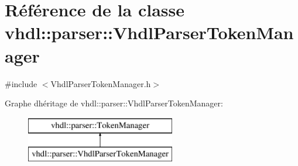 \hypertarget{classvhdl_1_1parser_1_1_vhdl_parser_token_manager}{}\section{Référence de la classe vhdl\+:\+:parser\+:\+:Vhdl\+Parser\+Token\+Manager}
\label{classvhdl_1_1parser_1_1_vhdl_parser_token_manager}


{\ttfamily \#include $<$Vhdl\+Parser\+Token\+Manager.\+h$>$}

Graphe d\textquotesingle{}héritage de vhdl\+:\+:parser\+:\+:Vhdl\+Parser\+Token\+Manager\+:\begin{figure}[H]
\begin{center}
\leavevmode
\includegraphics[height=2.000000cm]{classvhdl_1_1parser_1_1_vhdl_parser_token_manager}
\end{center}
\end{figure}
